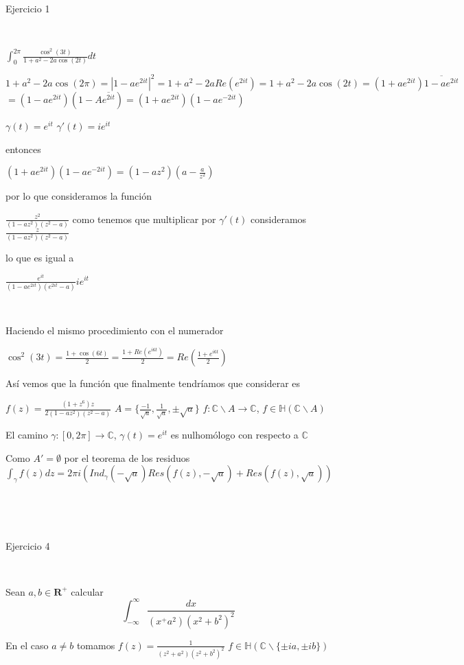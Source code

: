 Ejercicio 1

\

$\int_{0}^{2\pi} \frac{\cos^2(3t)}{1+a^2-2a\cos(2t)} dt$

$1+a^2-2a\cos(2\pi) = |1-ae^{2it}|^2 = 1+a^2-2aRe(e^{2it}) =  1+a^2-2a\cos(2t) = (1+ae^{2it})\overline{1-ae^{2it}}$
$= (1-ae^{2it})(1-A\overline{e^{2it}}) = (1+ae^{2it})(1-ae^{-2it})$

$\gamma(t) = e^{it}$
$\gamma'(t) = ie^{it}$

entonces

$(1+ae^{2it})(1-ae^{-2it}) = (1-az^2)(a-\frac{a}{z^2})$

por lo que consideramos la función 

$\frac{z^2}{(1-az^2)(z^2-a)}$ 
como tenemos que multiplicar por $\gamma'(t)$ consideramos $\frac{z}{(1-az^2)(z^2-a)}$

lo que es igual a

$\frac{e^{it}}{(1-ae^{2it})(e^{2it}-a)} ie^{it}$

\

Haciendo el mismo procedimiento con el numerador

$\cos^2(3t) = \frac{1+\cos(6t)}{2} = \frac{1+Re(e^{i6t})}{2} = Re(\frac{1+e^{i6t}}{2})$


Así vemos que la función que finalmente tendríamos que considerar es

$f(z) = \frac{(1+z^6)z}{2(1-az^2)(z^2-a)}$
$A = \{ \frac{-1}{\sqrt{a}}, \frac{1}{\sqrt{a}}, \pm\sqrt{a} \}$
$f:\mathbb{C}\backslash A \rightarrow \mathbb{C}$, $f\in\mathbb{H}(\mathbb{C}\backslash A)$

El camino $\gamma:[0,2\pi] \rightarrow \mathbb{C}$, $\gamma(t) = e^{it}$ es nulhomólogo con respecto a $\mathbb{C}$

Como $A' = \emptyset$ por el teorema de los residuos
$\int_{\gamma} f(z)dz = 2\pi i \left( Ind_{\gamma}(-\sqrt{a})Res(f(z),-\sqrt{a}) + Res(f(z), \sqrt{a}) \right)$


\

\

Ejercicio 4

\

Sean $a,b\in\mathbf{R}^+$ calcular
$$ \int_{-\infty}^{\infty} \frac{dx}{(x^+a^2)(x^2+b^2)^2} $$


En el caso $a\not = b$ tomamos $f(z) = \frac{1}{(z^2+a^2)(z^2+b^2)^2}$
$f\in\mathbb{H}( \mathbb{C}\backslash\{ \pm ia, \pm ib \} )$

